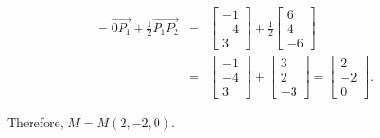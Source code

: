 \documentclass[pdf,9pt]{beamer}
\begin{document}
{\begin{solution}
\begin{eqnarray*}
	=\overrightarrow{0P_1}
	+\frac{1}{2} \overrightarrow{P_1P_2}
& = &
\left[\begin{array}{r}
	-1 \\ -4 \\ 3
\end{array}\right]
+ \frac{1}{2}
\left[\begin{array}{r}
	6 \\ 4 \\ -6
\end{array}\right] \\
& = &
\left[\begin{array}{r}
	-1 \\ -4 \\ 3
\end{array}\right]
+
\left[\begin{array}{r}
	3 \\ 2 \\ -3
\end{array}\right]
=
\left[\begin{array}{r}
	2 \\ -2 \\ 0
\end{array}\right].
    \end{eqnarray*}

    Therefore, $M=M(2,-2,0)$.
\end{solution}
}
\end{document}
